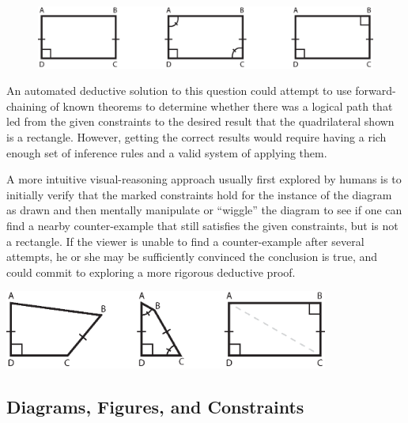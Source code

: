 \begin{figure}
\includegraphics{diagrams/rectangles.eps}
\end{figure}


An automated deductive solution to this question could attempt to use
forward-chaining of known theorems to determine whether there was a
logical path that led from the given constraints to the desired result
that the quadrilateral shown is a rectangle.  However, getting the
correct results would require having a rich enough set of inference
rules and a valid system of applying them.

A more intuitive visual-reasoning approach usually first explored by
humans is to initially verify that the marked constraints hold for the
instance of the diagram as drawn and then mentally manipulate or
``wiggle'' the diagram to see if one can find a nearby counter-example
that still satisfies the given constraints, but is not a rectangle.
If the viewer is unable to find a counter-example after several
attempts, he or she may be sufficiently convinced the conclusion is
true, and could commit to exploring a more rigorous deductive proof.

\begin{center}
\includegraphics[width=0.80\textwidth]{diagrams/rectangles-answer.eps}
\end{center}


\subsection{Diagrams, Figures, and Constraints}

